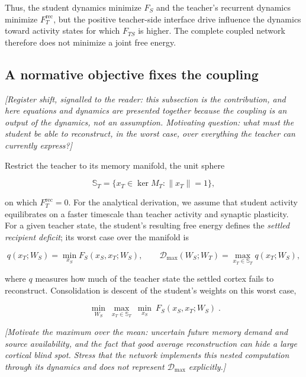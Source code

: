 \documentclass[10pt,letterpaper]{article}
\theoremstyle{plain}
\theoremstyle{remark}
\begin{document}
Thus, the student dynamics minimize $F_S$ and the teacher's recurrent dynamics minimize $F_T^{\mathrm{rec}}$, but the positive teacher-side interface drive influence the dynamics toward activity states for which $F_{TS}$ is higher. The complete coupled network therefore does not minimize a joint free energy.



\subsection{A normative objective fixes the coupling}

\textit{[Register shift, signalled to the reader: this subsection is the contribution, and here equations and dynamics are presented together because the coupling is an output of the dynamics, not an assumption. Motivating question: what must the student be able to reconstruct, in the worst case, over everything the teacher can currently express?]}

Restrict the teacher to its memory manifold, the unit sphere

\begin{equation}
\mathbb S_T=\{x_T\in\ker M_T:\|x_T\|=1\},
\label{eq:teacher-sphere}
\end{equation}

on which $F_T^{\mathrm{rec}}=0$. For the analytical derivation, we assume that student activity equilibrates on a faster timescale than teacher activity and synaptic plasticity. For a given teacher state, the student's resulting free energy defines the \emph{settled recipient deficit}; its worst case over the manifold is

\begin{equation}
q(x_T;W_S)=\min_{x_S}F_S(x_S,x_T;W_S),
\qquad
\mathcal D_{\max}(W_S;W_T)=\max_{x_T\in\mathbb S_T}q(x_T;W_S),
\label{eq:deficit}
\end{equation}

where $q$ measures how much of the teacher state the settled cortex fails to reconstruct. Consolidation is descent of the student's weights on this worst case,

\begin{equation}
\boxed{\;\min_{W_S}\ \max_{x_T\in\mathbb S_T}\ \min_{x_S}\ F_S(x_S,x_T;W_S)\;}.
\label{eq:objective}
\end{equation}

\textit{[Motivate the maximum over the mean: uncertain future memory demand and source availability, and the fact that good average reconstruction can hide a large cortical blind spot. Stress that the network implements this nested computation through its dynamics and does not represent $\mathcal D_{\max}$ explicitly.]}
\end{document}
